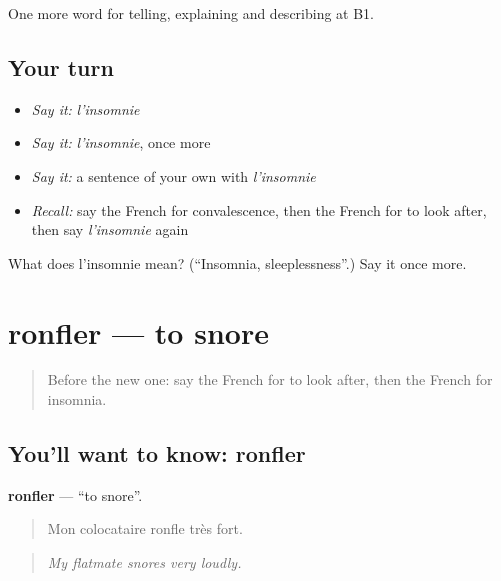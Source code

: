 \begin{grammarlens}[title={What you've built}]
One more word for telling, explaining and describing at B1.
\end{grammarlens}

\subsection*{Your turn}
\begin{itemize}
\raggedright
  \item \emph{Say it:} \emph{l'insomnie}
  \item \emph{Say it:} \emph{l'insomnie}, once more
  \item \emph{Say it:} a sentence of your own with \emph{l'insomnie}
  \item \emph{Recall:} say the French for convalescence, then the French for to look after, then say \emph{l'insomnie} again
\end{itemize}

\begin{tcolorbox}[breakable,colback=teal!4,colframe=teal!35!black,title={Before you move on}]
What does l'insomnie mean? (\textquotedblleft{}Insomnia, sleeplessness\textquotedblright{}.) Say it once more.
\end{tcolorbox}
\section[ronfler]{ronfler — to snore}

\label{lesson:FR-C486-ronfler}



\begin{quote}
Before the new one: say the French for to look after, then the French for insomnia.
\end{quote}

\subsection*{You'll want to know: ronfler}
\textbf{ronfler} — \textquotedblleft{}to snore\textquotedblright{}.

\begin{quote}
Mon colocataire ronfle très fort.
\end{quote}

\begin{quote}
\emph{My flatmate snores very loudly.}
\end{quote}

